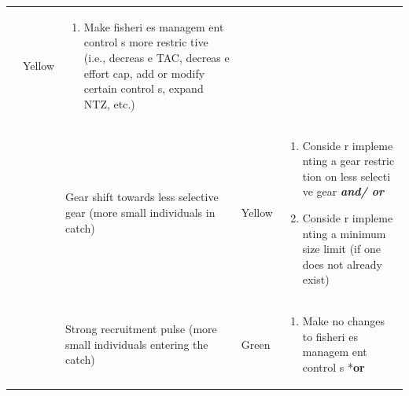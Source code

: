 \documentclass[]{book}
\providecommand{\tightlist}{%
  \setlength{\itemsep}{0pt}\setlength{\parskip}{0pt}}
\begin{document}
\begin{longtable}[]{@{}lllll@{}}
\begin{minipage}[t]{0.19\columnwidth}
\end{minipage} & \begin{minipage}[t]{0.19\columnwidth}\raggedright\strut
Yellow\strut
\end{minipage} & \begin{minipage}[t]{0.19\columnwidth}\raggedright\strut
\begin{enumerate}
\def\labelenumi{\arabic{enumi}.}
\tightlist
\item
  Make fisheri es managem ent control s more restric tive (i.e., decreas
  e TAC, decreas e effort cap, add or modify certain control s, expand
  NTZ, etc.)
\end{enumerate}\strut
\end{minipage}\tabularnewline
\begin{minipage}[t]{0.19\columnwidth}\raggedright\strut
\strut
\end{minipage} & \begin{minipage}[t]{0.19\columnwidth}\raggedright\strut
\strut
\end{minipage} & \begin{minipage}[t]{0.19\columnwidth}\raggedright\strut
Gear shift towards less selective gear (more small individuals in
catch)\strut
\end{minipage} & \begin{minipage}[t]{0.19\columnwidth}\raggedright\strut
Yellow\strut
\end{minipage} & \begin{minipage}[t]{0.19\columnwidth}\raggedright\strut
\begin{enumerate}
\def\labelenumi{\arabic{enumi}.}
\item
  Conside r impleme nting a gear restric tion on less selecti ve gear
  \textbf{\emph{and/ or}}
\item
  Conside r impleme nting a minimum size limit (if one does not already
  exist)
\end{enumerate}\strut
\end{minipage}\tabularnewline
\begin{minipage}[t]{0.19\columnwidth}\raggedright\strut
\strut
\end{minipage} & \begin{minipage}[t]{0.19\columnwidth}\raggedright\strut
\strut
\end{minipage} & \begin{minipage}[t]{0.19\columnwidth}\raggedright\strut
Strong recruitment pulse (more small individuals entering the
catch)\strut
\end{minipage} & \begin{minipage}[t]{0.19\columnwidth}\raggedright\strut
Green\strut
\end{minipage} & \begin{minipage}[t]{0.19\columnwidth}\raggedright\strut
\begin{enumerate}
\def\labelenumi{\arabic{enumi}.}
\tightlist
\item
  Make no changes to fisheri es managem ent control s *\textbf{or}
\end{enumerate}


\end{minipage}
\end{longtable}
\end{document}
